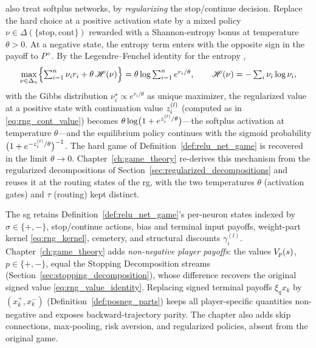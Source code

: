 \begin{remark}\label{rem:softplus_game}
\textcite{Gaubert2025} also treat softplus networks, by \emph{regularizing} the stop/continue decision. Replace the hard choice at a positive activation state by a mixed policy $\nu \in \Delta(\{\mathrm{stop}, \mathrm{cont}\})$ rewarded with a Shannon-entropy bonus at temperature $\theta > 0$. At a negative state, the entropy term enters with the opposite sign in the payoff to $P^+$. By the Legendre--Fenchel identity for the entropy \parencite{BoydVandenberghe2004},
\begin{equation}
	\max_{\nu \in \Delta_n} \Bigl\{ \textstyle\sum_{i=1}^{n} \nu_i r_i + \theta\, \mathscr{H}(\nu) \Bigr\}
	= \theta \log \textstyle\sum_{i=1}^{n} e^{r_i / \theta},
	\qquad
	\mathscr{H}(\nu) = -\textstyle\sum_i \nu_i \log \nu_i,
	\label{eq:legendre_fenchel}
\end{equation}
with the Gibbs distribution $\nu^{\star}_i \propto e^{r_i/\theta}$ as unique maximizer, the regularized value at a positive state with continuation value $z^{(l)}_i$ (computed as in \eqref{eq:rng_cont_value}) becomes $\theta \log\bigl(1 + e^{z^{(l)}_i / \theta}\bigr)$---the softplus activation at temperature $\theta$---and the equilibrium policy continues with the sigmoid probability $\bigl(1 + e^{-z^{(l)}_i/\theta}\bigr)^{-1}$. The hard game of Definition~\ref{def:relu_net_game} is recovered in the limit $\theta \to 0$. Chapter~\ref{ch:game_theory} re-derives this mechanism from the regularized decompositions of Section~\ref{sec:regularized_decompositions} and reuses it at the routing states of the \ac{rg}, with the two temperatures $\theta$ (activation gates) and $\tau$ (routing) kept distinct.
\end{remark}

\begin{remark}\label{rem:inherited_vs_new}
The \ac{sg} retains Definition~\ref{def:relu_net_game}'s per-neuron states indexed by $\sigma\in\{+,-\}$, stop/continue actions, bias and terminal input payoffs, weight-part kernel \eqref{eq:rng_kernel}, cemetery, and structural discounts $\gamma^{(l)}_i$. Chapter~\ref{ch:game_theory} adds \emph{non-negative player payoffs}: the values $V_{p}(s)$, $p\in\{+,-\}$, equal the Stopping Decomposition streams (Section~\ref{sec:stopping_decomposition}), whose difference recovers the original signed value \eqref{eq:rng_value_identity}. Replacing signed terminal payoffs $\xi_qx_k$ by $(x_k^+,x_k^-)$ (Definition~\ref{def:posneg_parts}) keeps all player-specific quantities non-negative and exposes backward-trajectory parity. The chapter also adds skip connections, max-pooling, risk aversion, and regularized policies, absent from the original game.
\end{remark}

